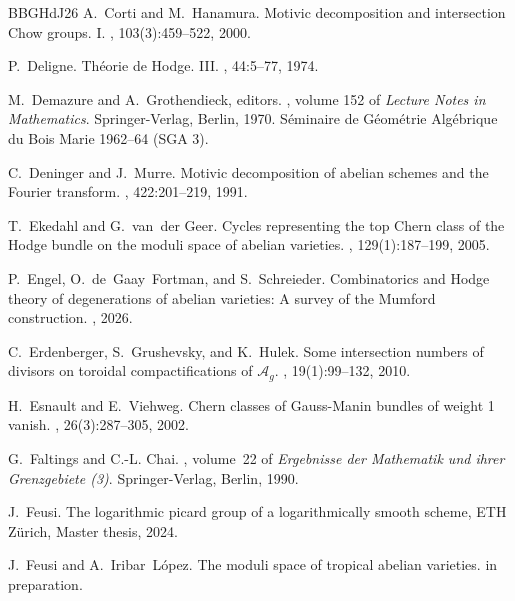 \documentclass[11pt]{article}
\theoremstyle{definition}
\begin{document}
\begin{thebibliography}{BBGHdJ26}
A.~Corti and M.~Hanamura.
\newblock Motivic decomposition and intersection {C}how groups. {I}.
, 103(3):459--522, 2000.

P.~Deligne.
\newblock Th\'eorie de {H}odge. {III}.
, 44:5--77, 1974.

M.~Demazure and A.~Grothendieck, editors.
, volume 152 of {\em Lecture Notes in Mathematics}.
\newblock Springer-Verlag, Berlin, 1970.
\newblock S{\'e}minaire de G{\'e}om{\'e}trie Alg{\'e}brique du Bois Marie 1962--64 (SGA 3).

C.~Deninger and J.~Murre.
\newblock Motivic decomposition of abelian schemes and the {F}ourier transform.
, 422:201--219, 1991.

T.~Ekedahl and G.~van~der Geer.
\newblock Cycles representing the top {C}hern class of the {H}odge bundle on the moduli space of abelian varieties.
, 129(1):187--199, 2005.

P.~Engel, O.~de~Gaay~Fortman, and S.~Schreieder.
\newblock Combinatorics and {H}odge theory of degenerations of abelian varieties: {A} survey of the {M}umford construction.
, 2026.

C.~Erdenberger, S.~Grushevsky, and K.~Hulek.
\newblock Some intersection numbers of divisors on toroidal compactifications of {$\mathcal{A}_g$}.
, 19(1):99--132, 2010.

H.~Esnault and E.~Viehweg.
\newblock Chern classes of {G}auss-{M}anin bundles of weight 1 vanish.
, 26(3):287--305, 2002.

G.~Faltings and C.-L. Chai.
, volume~22 of {\em Ergebnisse der Mathematik und ihrer Grenzgebiete (3)}.
\newblock Springer-Verlag, Berlin, 1990.

J.~Feusi.
\newblock The logarithmic picard group of a logarithmically smooth scheme, {E}{T}{H} {Z}\"urich, {M}aster thesis, 2024.

J.~Feusi and A.~Iribar~L\'{o}pez.
\newblock The moduli space of tropical abelian varieties.
\newblock in preparation.


\end{thebibliography}
\end{document}
